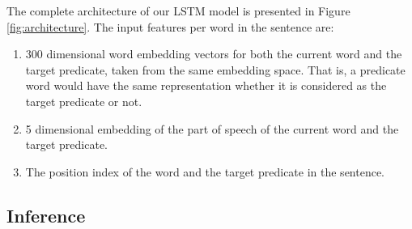The complete architecture of our LSTM model is presented in Figure \ref{fig:architecture}. The input features per word in the sentence are:
\begin{enumerate}
\item
300 dimensional word embedding vectors for both the current word and the target predicate, taken from the same embedding space.
That is, a predicate word would have the same
representation whether it is considered as the target predicate or not.

\item 5 dimensional embedding of the part of speech of the current word and the target predicate.
\item The position index of the word and the target predicate in the sentence.

\end{enumerate}

\subsection{Inference}
\label{subsec-inference}


